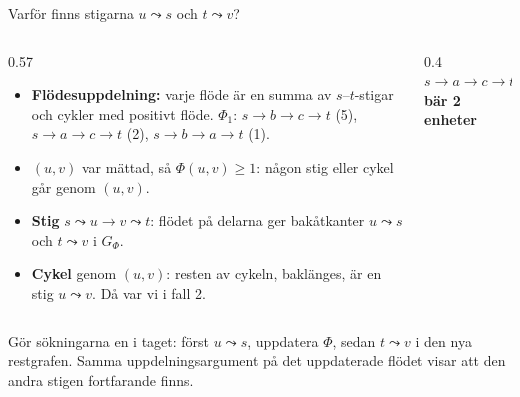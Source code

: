 {\kaninbg
\begin{frame}{\kh Varför finns stigarna $u\leadsto s$ och $t\leadsto v$?}
\begin{columns}[T]
\begin{column}{0.57\textwidth}
\small
\begin{itemize}\setlength{\itemsep}{3pt}
  \item \textbf{Flödesuppdelning:} varje flöde är en summa av $s$--$t$-stigar och cykler med
        positivt flöde. $\Phi_1$: $s{\to}b{\to}c{\to}t$ (5), $s{\to}a{\to}c{\to}t$ (2),
        $s{\to}b{\to}a{\to}t$ (1).
  \item $(u,v)$ var mättad, så $\Phi(u,v)\ge1$: någon stig eller cykel går genom $(u,v)$.
  \item \textbf{Stig} $s\leadsto u\to v\leadsto t$: flödet på delarna ger bakåtkanter
        $u\leadsto s$ och $t\leadsto v$ i $G_\Phi$.
  \item \textbf{Cykel} genom $(u,v)$: resten av cykeln, baklänges, är en stig $u\leadsto v$.
        Då var vi i fall 2.
\end{itemize}
\end{column}
\begin{column}{0.4\textwidth}
\centering
{\footnotesize\bfseries\color{kthgrass}$s\to a\to c\to t$ bär 2 enheter}\par

\end{column}
\end{columns}
\vfill
\begin{kaninbox}[fontupper=\footnotesize]
Gör sökningarna en i taget: först $u\leadsto s$, uppdatera $\Phi$, sedan $t\leadsto v$ i den nya
restgrafen. Samma uppdelningsargument på det uppdaterade flödet visar att den andra stigen
fortfarande finns.
\end{kaninbox}
\end{frame}}

